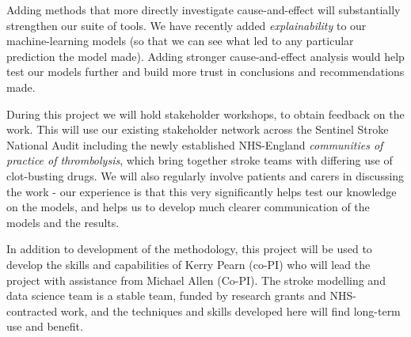 Adding methods that more directly investigate cause-and-effect will substantially strengthen our suite of tools. We have recently added \textit{explainability} to our machine-learning models (so that we can see what led to any particular prediction the model made). Adding stronger cause-and-effect analysis would help test our models further and build more trust in conclusions and recommendations made. 

During this project we will hold stakeholder workshops, to obtain feedback on the work. This will use our existing stakeholder network across the Sentinel Stroke National Audit including the newly established NHS-England \textit{communities of practice of thrombolysis}, which bring together stroke teams with differing use of clot-busting drugs. We will also regularly involve patients and carers in discussing the work - our experience is that this very significantly helps test our knowledge on the models, and helps us to develop much clearer communication of the models and the results.

In addition to development of the methodology, this project will be used to develop the skills and capabilities of Kerry Pearn (co-PI) who will lead the project with assistance from Michael Allen (Co-PI). The stroke modelling and data science team is a stable team, funded by research grants and NHS-contracted work, and the techniques and skills developed here will find long-term use and benefit.